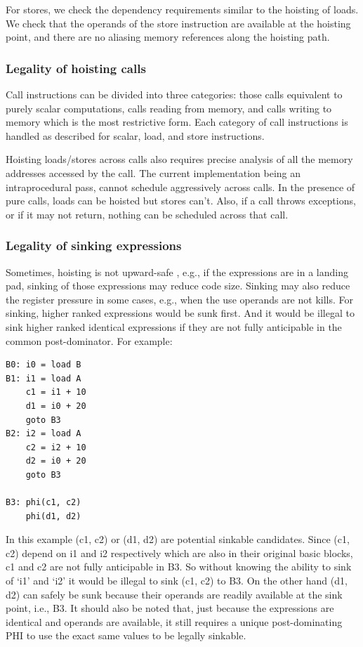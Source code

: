 \documentclass[sigplan,10pt,review,anonymous]{acmart}\settopmatter{printfolios=true,printccs=false,printacmref=false}
\begin{document}
For stores, we check the dependency requirements similar to the hoisting of
loads. We check that the operands of the store instruction are available at the
hoisting point, and there are no aliasing memory references along the hoisting
path.

\subsubsection{Legality of hoisting calls}
Call instructions can be divided into three categories: those calls equivalent
to purely scalar computations, calls reading from memory, and calls writing to
memory which is the most restrictive form.  Each category of call instructions
is handled as described for scalar, load, and store instructions.

Hoisting loads/stores across calls also requires precise analysis of all the
memory addresses accessed by the call. The current implementation being an
intraprocedural pass, cannot schedule aggressively across calls. In the presence
of pure calls, loads can be hoisted but stores can't. Also, if a call throws
exceptions, or if it may not return, nothing can be scheduled across that call.

\subsubsection{Legality of sinking expressions}
\label{subsec:legality-sink}
Sometimes, hoisting is not upward-safe \cite{click1995global}, e.g., if the
expressions are in a landing pad, sinking of those expressions
may reduce code size. Sinking may also reduce the register pressure in some
cases, e.g., when the use operands are not kills. For sinking, higher ranked
expressions would be sunk first. And it would be illegal to sink higher ranked
identical expressions if they are not fully anticipable in the common
post-dominator. For example:

\begin{verbatim}
B0: i0 = load B
B1: i1 = load A
    c1 = i1 + 10
    d1 = i0 + 20
    goto B3
B2: i2 = load A
    c2 = i2 + 10
    d2 = i0 + 20
    goto B3

B3: phi(c1, c2)
    phi(d1, d2)
\end{verbatim}

In this example (c1, c2) or (d1, d2) are potential sinkable candidates. Since
(c1, c2) depend on i1 and i2 respectively which are also in their original basic
blocks, c1 and c2 are not fully anticipable in B3. So without knowing the ability to sink
of `i1' and `i2' it would be illegal to sink (c1, c2) to B3. On the other hand
(d1, d2) can safely be sunk because their operands are readily available at the
sink point, i.e., B3. It should also be noted that, just because the expressions
are identical and operands are available, it still requires a unique
post-dominating PHI to use the exact same values to be legally sinkable.
\end{document}
